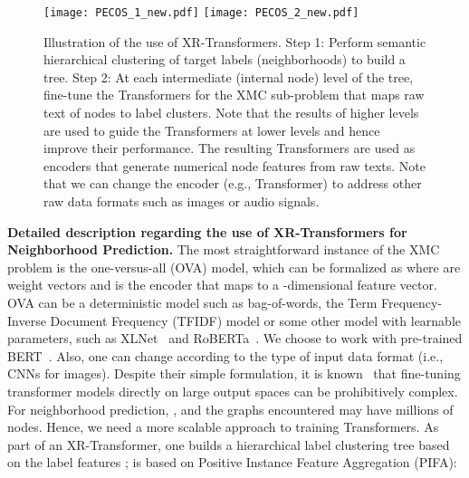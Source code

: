 \documentclass{article} \usepackage{iclr2022_conference,times}
\begin{document}
\begin{figure}
\centering
  \texttt{[image: PECOS\_1\_new.pdf]}
  \texttt{[image: PECOS\_2\_new.pdf]}
 \vspace{-0.5cm}
\caption{Illustration of the use of XR-Transformers. Step 1: Perform semantic hierarchical clustering of target labels (neighborhoods) to build a tree. Step 2: At each intermediate (internal node) level of the tree, fine-tune the Transformers for the XMC sub-problem that maps raw text of nodes to label clusters. Note that the results of higher levels are used to guide the Transformers at lower levels and hence improve their performance. The resulting Transformers are used as encoders that generate numerical node features from raw texts. Note that we can change the encoder (e.g., Transformer) to address other raw data formats such as images or audio signals.}\label{fig:XRT}
\vspace{-0.1in}
\end{figure}

\textbf{Detailed description regarding the use of XR-Transformers for Neighborhood Prediction.}
The most straightforward instance of the XMC problem is the one-versus-all (OVA) model, which can be formalized as  where  are weight vectors and  is the encoder that maps  to a -dimensional feature vector. OVA can be a deterministic model such as bag-of-words, the Term Frequency-Inverse Document Frequency (TFIDF) model or some other model with learnable parameters, such as XLNet~\citep{yang2019xlnet} and RoBERTa~\citep{liu2019roberta}. We choose to work with pre-trained BERT~\citep{devlin2018bert}. Also, one can change  according to the type of input data format (i.e., CNNs for images). Despite their simple formulation, it is known~\cite{chang2020taming} that fine-tuning transformer models directly on large output spaces can be prohibitively complex. For neighborhood prediction, , and the graphs encountered may have millions of nodes. Hence, we need a more scalable approach to training Transformers. As part of an XR-Transformer, one builds a hierarchical label clustering tree based on the label features ;  is based on Positive Instance Feature Aggregation (PIFA):
\end{document}
